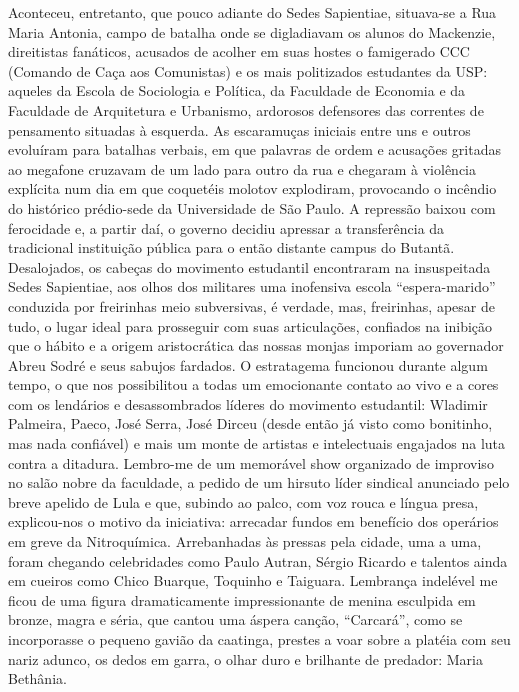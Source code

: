 Aconteceu, entretanto, que pouco adiante do Sedes Sapientiae, situava-se a Rua Maria Antonia, campo de batalha onde se digladiavam os alunos do Mackenzie, direitistas fanáticos, acusados de acolher em suas hostes o famigerado CCC (Comando de Caça aos Comunistas) e os mais politizados estudantes da USP: aqueles da Escola de Sociologia e Política, da Faculdade de Economia e da Faculdade de Arquitetura e Urbanismo, ardorosos defensores das correntes de pensamento situadas à esquerda.
As escaramuças iniciais entre uns e outros evoluíram para batalhas verbais, em que palavras de ordem e acusações gritadas ao megafone cruzavam de um lado para outro da rua e chegaram à violência explícita num dia em que coquetéis molotov explodiram, provocando o incêndio do histórico prédio-sede da Universidade de São Paulo.
A repressão baixou com ferocidade e, a partir daí, o governo decidiu apressar a transferência da tradicional instituição pública para o então distante campus do Butantã.
Desalojados, os cabeças do movimento estudantil encontraram na insuspeitada Sedes Sapientiae, aos olhos dos militares uma inofensiva escola ``espera-marido'' conduzida por freirinhas meio subversivas, é verdade, mas, freirinhas, apesar de tudo, o lugar ideal para prosseguir com suas articulações, confiados na inibição que o hábito e a origem aristocrática das nossas monjas imporiam ao governador Abreu Sodré e seus sabujos fardados.
O estratagema funcionou durante algum tempo, o que nos possibilitou a todas um emocionante contato ao vivo e a cores com os lendários e desassombrados líderes do movimento estudantil: Wladimir Palmeira, Paeco, José Serra, José Dirceu (desde então já visto como bonitinho, mas nada confiável) e mais um monte de artistas e intelectuais engajados na luta contra a ditadura.
Lembro-me de um memorável show organizado de improviso no salão nobre da faculdade, a pedido de um hirsuto líder sindical anunciado pelo breve apelido de Lula e que, subindo ao palco, com voz rouca e língua presa, explicou-nos o motivo da iniciativa: arrecadar fundos em benefício dos operários em greve da Nitroquímica.
 Arrebanhadas às pressas pela cidade, uma a uma, foram chegando celebridades como Paulo Autran, Sérgio Ricardo e talentos ainda em cueiros como Chico Buarque, Toquinho e Taiguara.
Lembrança indelével me ficou de uma figura dramaticamente impressionante de menina esculpida em bronze, magra e séria, que cantou uma áspera canção, ``Carcará'', como se incorporasse o pequeno gavião da caatinga, prestes a voar sobre a platéia com seu nariz adunco, os dedos em garra, o olhar duro e brilhante de predador: Maria Bethânia.


